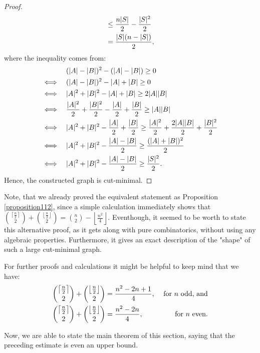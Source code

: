 \begin{prop}
\begin{proof}
\begin{align}
&\leq\frac{n|S|}{2}-\frac{|S|^2}{2}\notag\\
&=\frac{|S|(n-|S|)}{2},\notag
\end{align}
where the inequality comes from:
\begin{align}
&\quad\quad\quad\:\, (|A|-|B|)^2-(|A|-|B|)\geq 0\notag\\
&\Longleftrightarrow\quad (|A|-|B|)^2-|A|+|B|\geq 0\notag\\
&\Longleftrightarrow\quad |A|^2+|B|^2-|A|+|B|\geq 2|A||B|\notag\\
&\Longleftrightarrow\quad \frac{|A|^2}{2}+\frac{|B|^2}{2}-\frac{|A|}{2}+\frac{|B|}{2}\geq |A||B|\notag\\
&\Longleftrightarrow\quad |A|^2+|B|^2-\frac{|A|}{2}+\frac{|B|}{2}\geq \frac{|A|^2}{2}+\frac{2|A||B|}{2}+\frac{|B|^2}{2}\notag\\
&\Longleftrightarrow\quad |A|^2+|B|^2-\frac{|A|-|B|}{2}\geq\frac{(|A|+|B|)^2}{2}\notag\\
&\Longleftrightarrow\quad |A|^2+|B|^2-\frac{|A|-|B|}{2}\geq\frac{|S|^2}{2}.\notag
\end{align}
Hence, the constructed graph is cut-minimal.
\end{proof}
\end{prop}

Note, that we already proved the equivalent statement as Proposition \ref{proposition112}, since a simple calculation immediately shows that \(\binom{\left\lceil\frac{n}{2}\right\rceil}{2}+\binom{\left\lfloor\frac{n}{2}\right\rfloor}{2}=\binom{n}{2}-\left\lfloor\frac{n^2}{4}\right\rfloor\). Eventhough, it seemed to be worth to state this alternative proof, as it gets along with pure combinatorics, without using any algebraic properties. Furthermore, it gives an exact description of the "shape" of such a large cut-minimal graph.

\begin{rem}\label{remark3}
For further proofs and calculations it might be helpful to keep mind that we have:
\begin{align}
&\binom{\left\lceil\frac{n}{2}\right\rceil}{2}+\binom{\left\lfloor\frac{n}{2}\right\rfloor}{2}=\frac{n^2-2n+1}{4},&\text{ for }n\text{ odd, and}\notag \\
&\binom{\left\lceil\frac{n}{2}\right\rceil}{2}+\binom{\left\lfloor\frac{n}{2}\right\rfloor}{2}=\frac{n^2-2n}{4},&\text{ for }n\text{ even.}\notag
\end{align}
\end{rem}

Now, we are able to state the main theorem of this section, saying that the preceding estimate is even an upper bound.

